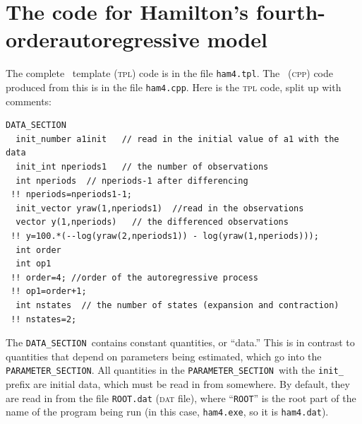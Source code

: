 \documentclass{admbmanual}
\newcommand\DS{\texttt{DATA\_SECTION}}
\newcommand\PS{\texttt{PARAMETER\_SECTION}}
\begin{document}
\section{The code for Hamilton's fourth-order\br autoregressive model}

The complete \ADM\ template (\textsc{tpl}) code is in the file \texttt{ham4.tpl}.
The \cplus\  (\textsc{cpp}) code produced from this is in the file \texttt{ham4.cpp}.
Here is the \textsc{tpl} code, split up with comments:
\begin{lstlisting}
DATA_SECTION
  init_number a1init   // read in the initial value of a1 with the data
  init_int nperiods1   // the number of observations
  int nperiods  // nperiods-1 after differencing
 !! nperiods=nperiods1-1;
  init_vector yraw(1,nperiods1)  //read in the observations
  vector y(1,nperiods)   // the differenced observations
 !! y=100.*(--log(yraw(2,nperiods1)) - log(yraw(1,nperiods))); 
  int order 
  int op1  
 !! order=4; //order of the autoregressive process
 !! op1=order+1;
  int nstates  // the number of states (expansion and contraction)
 !! nstates=2;
\end{lstlisting}
The \DS\ contains constant quantities, or ``data.'' This is in contrast
to quantities that depend on parameters being estimated, which go into the
\PS. All quantities in the \PS\
with the \texttt{init\_} prefix are initial data,
which must be read in from somewhere. By default, they are read in from the
file \texttt{ROOT.dat} (\textsc{dat} file), where ``\texttt{ROOT}'' is the root part of the name 
of the program being run (in this case, \texttt{ham4.exe}, so it is \texttt{ham4.dat}).
\end{document}
